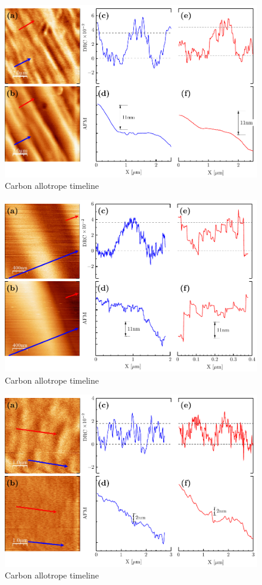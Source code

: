 \begin{figure}
	\centering
	\includegraphics[width=0.75\linewidth]{FIGURES/Experimental_results/FG166L-01.pdf}
	\caption{Carbon allotrope timeline}
	\label{fig:FG166L-01}
\end{figure}


\begin{figure}
	\centering
	\includegraphics[width=0.75\linewidth]{FIGURES/Experimental_results/FG166L-02.pdf}
	\caption{Carbon allotrope timeline}
	\label{fig:FG166L-02}
\end{figure}


\begin{figure}
	\centering
	\includegraphics[width=0.75\linewidth]{FIGURES/Experimental_results/FG166R.pdf}
	\caption{Carbon allotrope timeline}
	\label{fig:FG166R}
\end{figure}


